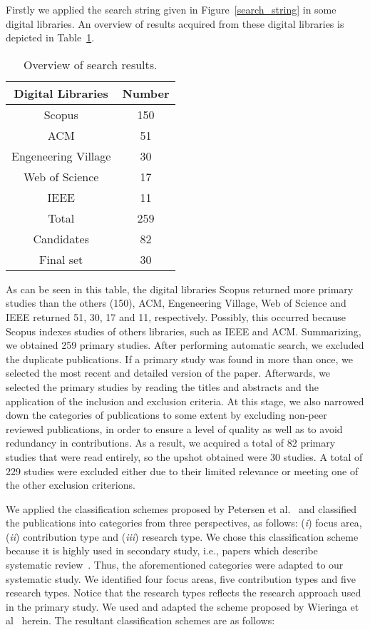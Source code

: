 Firstly we applied the search string given in Figure~\ref{search_string} in some digital libraries. An overview of results acquired from these digital libraries is depicted in Table~\ref{result_digital}.
\begin{table}[!h]
\centering
\caption{Overview of search results.}
\begin{tabular}{|c|c|}
\hline 
\cellcolor{gray}Digital Libraries & \cellcolor{gray}Number\tabularnewline
\hline 
\hline 
Scopus & 150\tabularnewline
\hline 
ACM & 51\tabularnewline
\hline 
Engeneering Village & 30\tabularnewline
\hline 
Web of Science & 17\tabularnewline
\hline 
IEEE & 11\tabularnewline
\hline 
\cellcolor{gray!25}Total & \cellcolor{gray!25}259\tabularnewline
\hline 
\cellcolor{gray!25}Candidates & \cellcolor{gray!25}82\tabularnewline
\hline 
\cellcolor{gray!25}Final set & \cellcolor{gray!25}30\tabularnewline
\hline 
\end{tabular}
\label{result_digital}
\end{table} 
As can be seen in this table, the digital libraries Scopus returned more primary studies than the others (150), ACM, Engeneering Village, Web of Science and IEEE returned 51, 30, 17 and 11, respectively. Possibly, this occurred because Scopus indexes studies of others libraries, such as IEEE and ACM. Summarizing, we obtained 259 primary studies. After performing automatic search, we excluded the duplicate publications. If a primary study was found in more than once, we selected the most recent and detailed version of the paper. Afterwards, we selected the primary studies by reading the titles and abstracts and the application of the inclusion and exclusion criteria. At this stage, we also narrowed down the categories of publications to some extent by excluding non-peer reviewed publications, in order to ensure a level of quality as well as to avoid redundancy in contributions. As a result, we acquired a total of 82 primary studies that were read entirely, so the upshot obtained were 30 studies. A total of 229 studies were excluded either due to their limited relevance or meeting one of the other exclusion criterions.

We applied the classification schemes proposed by Petersen et al.~\cite{Petersen:2008:SMS:2227115.2227123} and classified the publications into categories from three perspectives, as follows: (\textit{i}) focus area, (\textit{ii}) contribution type and (\textit{iii}) research type. We chose this classification scheme because it is highly used in secondary study, i.e., papers which describe systematic review~\cite{Durelli:2013:SRM:2480362.2480567}.%
 Thus, the aforementioned categories were adapted to our systematic study. We identified four focus areas, five contribution types and five research types. Notice that the research types reflects the research approach used in the primary study. We used and adapted the scheme proposed by Wieringa et al~\cite{Wieringa:2005:REP:1107677.1107683} herein. The resultant classification schemes are as follows:

